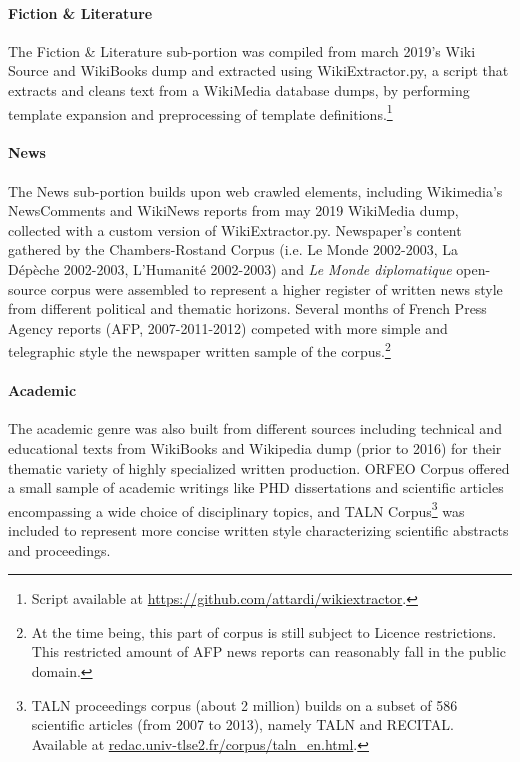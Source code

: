 \paragraph{\Cabernet Fiction \& Literature} \label{subsec:DescribeCaBeRnetFic}
The Fiction \& Literature sub-portion was compiled from march 2019's Wiki Source and WikiBooks dump and extracted using WikiExtractor.py, a script that extracts and cleans text from a WikiMedia database dumps, by performing template expansion and preprocessing of template definitions.\footnote{Script available at \url{https://github.com/attardi/wikiextractor}.}

\paragraph{\Cabernet News} \label{subsec:DescribeCaBeRnetNews}
The News sub-portion builds upon web crawled elements, including Wikimedia's NewsComments and WikiNews reports from may 2019 WikiMedia dump, collected with a custom version of WikiExtractor.py.
Newspaper's content gathered by the Chambers-Rostand Corpus (i.e. Le Monde 2002-2003, La Dépèche 2002-2003, L'Humanité 2002-2003) and \textit{Le Monde diplomatique} open-source corpus were assembled to represent a higher register of written news style from different political and thematic horizons.
Several months of French Press Agency reports (AFP, 2007-2011-2012) competed with more simple and telegraphic style the newspaper written sample of the corpus.\footnote{At the time being, this part of \Cabernet corpus is still subject to Licence restrictions. This restricted amount of AFP news reports can reasonably fall in the public domain.}

\paragraph{\Cabernet Academic} \label{subsec:DescribeCaBeRnetAcad}
The academic genre was also built from different sources including technical and educational texts from WikiBooks and Wikipedia dump (prior to 2016) for their thematic variety of highly specialized written production. \textsc{ORFEO} Corpus offered a small sample of academic writings like PHD dissertations and scientific articles encompassing a wide choice of disciplinary topics, and TALN Corpus\footnote{TALN proceedings corpus (about 2 million) builds on a subset of 586 scientific articles (from 2007 to 2013), namely TALN and RECITAL. Available at \url{redac.univ-tlse2.fr/corpus/taln_en.html}.} was included to represent more concise written style characterizing scientific abstracts and proceedings.

